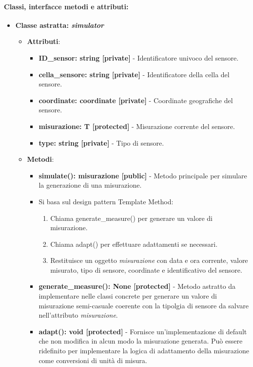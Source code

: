 \paragraph{Classi, interfacce metodi e attributi:}
\begin{itemize}
    \item {\textbf{Classe astratta: \textit{simulator}}}
    \begin{itemize}
        \item \textbf{Attributi}: 
        \begin{itemize}
            \item \textbf{ID\_sensor: string [private]} - Identificatore univoco del sensore.
            \item \textbf{cella\_sensore: string [private]} - Identificatore della cella del sensore.
            \item \textbf{coordinate: coordinate [private]} - Coordinate geografiche del sensore.
            \item \textbf{misurazione: T [protected]} - Misurazione corrente del sensore.
            \item \textbf{type: string [private]} - Tipo di sensore.
        \end{itemize}
        \item \textbf{Metodi}:
        \begin{itemize}
            \item \textbf{simulate(): misurazione [public]} - Metodo principale per simulare la generazione di una misurazione.
            \item 
            Si basa sul design pattern Template Method:
            \begin{enumerate}
                \item Chiama generate\_measure() per generare un valore di misurazione.
                \item Chiama adapt() per effettuare adattamenti se necessari.
                \item Restituisce un oggetto \textit{misurazione} con data e ora corrente, valore misurato, tipo di sensore, coordinate e identificativo del sensore.
            \end{enumerate}
            \item \textbf{generate\_measure(): None [protected]} - Metodo astratto da implementare nelle classi concrete per generare un valore di misurazione semi-casuale coerente con la tipolgia di sensore da salvare nell'attributo \textit{misurazione}.
            \item \textbf{adapt(): void [protected]} - Fornisce un'implementazione di default che non modifica in alcun modo la misurazione generata. Può essere ridefinito per implementare la logica di adattamento della misurazione come conversioni di unità di misura.

\end{itemize}
\end{itemize}
\end{itemize}
